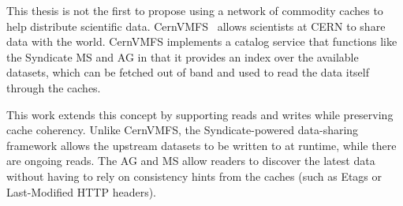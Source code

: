 This thesis is not the first to propose using a network of commodity caches to help
distribute scientific data.  CernVMFS~\cite{cernvmfs} allows scientists at CERN
to share data with the world.  CernVMFS implements a catalog service that
functions like the Syndicate MS and AG in that it provides an index over the
available datasets, which can be fetched out of band and used to read the data
itself through the caches.

This work extends this concept by supporting reads and writes while preserving
cache coherency.  Unlike CernVMFS, the Syndicate-powered data-sharing framework
allows the upstream datasets to be written
to at runtime, while there are ongoing reads.  The AG and MS allow readers to
discover the latest data without having to rely on consistency hints from the
caches (such as Etags or Last-Modified HTTP headers).

